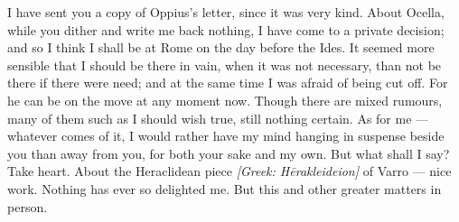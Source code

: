 

 I have sent you a copy of Oppius's letter, since it was very kind. About Ocella, while you dither and write me back nothing, I have come to a private decision; and so I think I shall be at Rome on the day before the Ides. It seemed more sensible that I should be there in vain, when it was not necessary, than not be there if there were need; and at the same time I was afraid of being cut off. For he can be on the move at any moment now. Though there are mixed rumours, many of them such as I should wish true, still nothing certain. As for me --- whatever comes of it, I would rather have my mind hanging in suspense beside you than away from you, for both your sake and my own. But what shall I say? Take heart. About the Heraclidean piece \textit{[Greek: Hērakleideion]} of Varro --- nice work. Nothing has ever so delighted me. But this and other greater matters in person.
